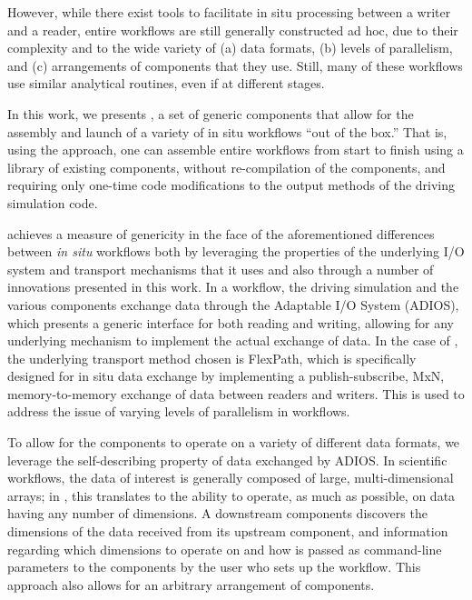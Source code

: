 However, while there exist tools to facilitate in situ
processing between a writer and a reader, 
entire workflows are still generally constructed ad hoc,
due to their complexity and to the wide variety of (a) data formats,
(b) levels of parallelism, and (c) arrangements of components that
they use. Still, many of these workflows use similar analytical
routines, even if at different stages.

In this work, we presents \sys, a set of
generic components that allow for the assembly
and launch of a variety of in situ workflows
``out of the box.''
That is, using the \sys approach, one can assemble
entire workflows from start to finish using a library
of existing components, without re-compilation of the
components, and requiring only one-time code modifications
to the output methods of the driving simulation code.


\sys achieves a measure of genericity in the face of
the aforementioned differences between
\textit{in situ} workflows both by
leveraging the properties of the underlying I/O
system and transport mechanisms that it uses
and also through a number of
innovations presented in this work.
In a \sys workflow, the driving simulation and
the various components exchange data through
the Adaptable I/O System (ADIOS),
which presents a generic interface for both
reading and writing, allowing for any underlying
mechanism to implement the actual exchange of data.
In the case of \sys, the underlying transport method
chosen is FlexPath, which is specifically designed for
in situ data exchange by implementing a publish-subscribe,
MxN, memory-to-memory exchange of data between readers
and writers. This is used to address the issue of
varying levels of parallelism in workflows.

To allow for the \sys components to operate
on a variety of different data formats, we
leverage the self-describing property
of data exchanged by ADIOS.
In scientific workflows, the data of interest
is generally composed of large, multi-dimensional
arrays; in \sys, this translates to
the ability to operate, as much as possible,
on data having any number of dimensions.
A downstream components discovers the dimensions
of the data received from its upstream component,
and information regarding which dimensions to operate
on and how is passed as command-line parameters
to the \sys components by the user who sets up
the workflow. This approach also allows for an
arbitrary arrangement of components.


